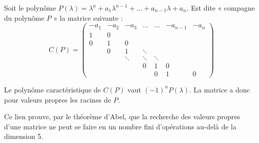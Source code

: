 \begin{defn}
	Soit le polynôme $P(\lambda) = \lambda^n + a_1 \lambda^{n-1} + \ldots + a_{n-1} \lambda + a_n$.
	Est dite « compagne du polynôme $P$ » la matrice suivante :
	$$C(P) = \begin{pmatrix}
		-a_1 & -a_2 & -a_3   & \ldots & \ldots & -a_{n-1} & -a_n \\
		1    & 0    &        &        &        &          &      \\
		0    & 1    & 0      &        &        &          &      \\
		     & 0    & 1      & \ddots &        &          &      \\
		     &      & \ddots & \ddots & \ddots &          &      \\
		     &      &        & 0      & 1      & 0        &      \\
		     &      &        &        & 0      & 1        & 0    \end{pmatrix}$$
\end{defn}

\begin{pop}
	Le polynôme caractéristique de $C(P)$ vaut $(-1)^n P(\lambda)$.
	La matrice a donc pour valeurs propres les racines de $P$.
\end{pop}

Ce lien prouve, par le théorème d'Abel, que la recherche des valeurs propres d'une matrice ne peut se faire en un nombre fini d'opérations au-delà de la dimension 5.

